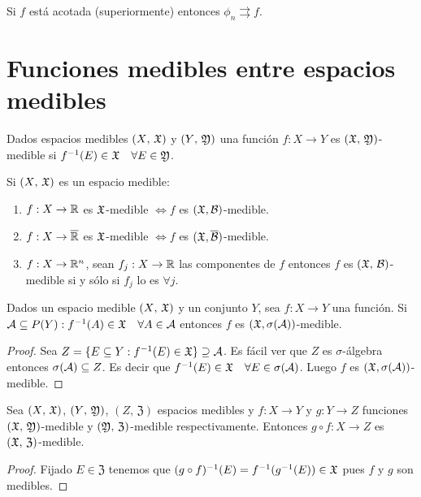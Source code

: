 \begin{note}
    Si \(f\) está acotada (superiormente) entonces \(\phi_n \rightrightarrows f\).
\end{note}

\clearpage

\section{Funciones medibles entre espacios medibles}

\begin{definition}
    Dados espacios medibles \((X\text{, } \mathfrak{X})\) y \((Y\text{, } \mathfrak{Y})\) una función \(f : X \to Y\) es \((\mathfrak{X}\text{, } \mathfrak{Y})\)-medible si \(f^{-1}(E) \in \mathfrak{X} \quad \forall E \in \mathfrak{Y}\).
\end{definition}

\begin{eg}
    Si \((X\text{, } \mathfrak{X})\) es un espacio medible:
    \begin{enumerate}
        \item \(f: X \to \mathbb{R}\) es \(\mathfrak{X}\)-medible \(\iff f\) es \((\mathfrak{X}, \mathcal{B})\)-medible.
        \item \(f: X \to \overline{\mathbb{R}}\) es \(\mathfrak{X}\)-medible \(\iff f\) es \((\mathfrak{X}, \overline{\mathcal{B}})\)-medible.
        \item \(f: X \to \mathbb{R}^n\), sean \(f_j : X \to \mathbb{R}\) las componentes de \(f\) entonces \(f\) es \((\mathfrak{X}\text{, } \mathcal{B})\)-medible si y sólo si \(f_j\) lo es \(\forall j\).
    \end{enumerate}
\end{eg}

\begin{prop}
    Dados un espacio medible \((X\text{, } \mathfrak{X})\) y un conjunto \(Y\), sea \(f: X \to Y\) una función.
    Si \(\mathcal{A} \subseteq P(Y) : f^{-1}(A) \in \mathfrak{X} \quad \forall A \in \mathcal{A}\) entonces \(f\) es \((\mathfrak{X}, \sigma(\mathcal{A}))\)-medible.

    \begin{proof}
        Sea \(Z = \{ E \subseteq Y : f^{-1}(E) \in \mathfrak{X} \} \supseteq \mathcal{A}\). Es fácil ver que \(Z\) es \(\sigma\)-álgebra entonces \(\sigma(\mathcal{A}) \subseteq Z\).
        Es decir que \(f^{-1}(E) \in \mathfrak{X} \quad \forall E \in \sigma(\mathcal{A})\). Luego \(f\) es \((\mathfrak{X}, \sigma(\mathcal{A}))\)-medible.
    \end{proof}
\end{prop}

\begin{prop}
    Sea \((X\text{, } \mathfrak{X})\), \((Y\text{, } \mathfrak{Y})\), \((Z\text{, } \mathfrak{Z})\) espacios medibles y \(f: X \to Y\) y \(g: Y \to Z\) funciones \((\mathfrak{X} \text{, } \mathfrak{Y})\)-medible y \((\mathfrak{Y} \text{, } \mathfrak{Z})\)-medible respectivamente.
    Entonces \(g \circ f : X \to Z\) es \((\mathfrak{X}\text{, } \mathfrak{Z})\)-medible.
    \begin{proof}
        Fijado \(E \in \mathfrak{Z}\) tenemos que \((g \circ f)^{-1}(E) = f^{-1}(g^{-1}(E)) \in \mathfrak{X}\) pues \(f\) y \(g\) son medibles.
    \end{proof}
\end{prop}